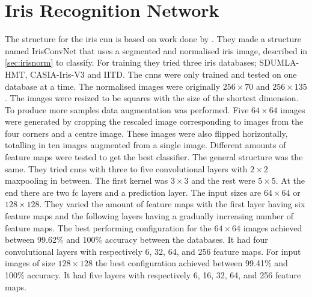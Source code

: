 
\section{Iris Recognition Network}
\label{sec:cnn_iris_rec}
The structure for the iris \gls{cnn} is based on work done by \cite{Al-Waisy2017}. They made a structure named IrisConvNet that uses a segmented and normalised iris image, described in \autoref{sec:irisnorm} to classify. For training they tried three iris databases; SDUMLA-HMT, CASIA-Iris-V3 and IITD. The \gls{cnn}s were only trained and tested on one database at a time.  The normalised images were originally $256\times70$ and $256\times135$. The images were resized to be squares with the size of the shortest dimension. To produce more samples data augmentation was performed. Five $64\times64$ images were generated by cropping the rescaled image corresponding to images from the four corners and a centre image. These images were also flipped horizontally, totalling in ten images augmented from a single image. Different amounts of feature maps were tested to get the best classifier. The general structure was the same. They tried \gls{cnn}s with three to five convolutional layers with $2\times2$ maxpooling in between. The first kernel was $3\times3$ and the rest were $5\times5$. At the end there are two \gls{fc} layers and a prediction layer. The input sizes are $64\times64$ or $128\times128$. They varied the amount of feature maps with the first layer having six feature maps and the following layers having a gradually increasing number of feature maps. The best performing configuration for the $64\times64$ images achieved between 99.62\% and 100\% accuracy between the databases. It had four convolutional layers with respectively 6, 32, 64, and 256 feature maps. For input images of size $128\times128$ the best configuration achieved between 99.41\% and 100\% accuracy. It had five layers with respectively 6, 16, 32, 64, and 256 feature maps.

